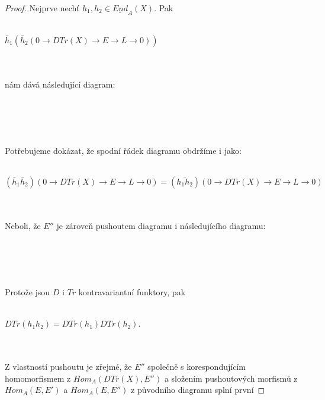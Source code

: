         \begin{proof}
           Nejprve nechť $h_1,h_2\in \underline{End}_A(X)$. Pak \\\\
           \centerline{$\bar h_1(\bar h_2(0\to DTr(X)\to E\to L\to 0))$} \\\\
           nám dává následující diagram:  \\\\
          \centerline{}\\\\\\
          Potřebujeme dokázat, že spodní řádek diagramu obdržíme i jako:\\\\
           \centerline{$(\bar h_1\bar h_2)(0\to DTr(X)\to E\to L\to 0)=(\overline{h_1 h_2})(0\to DTr(X)\to E\to L\to 0)$} \\\\
           Neboli, že $E''$ je zároveň pushoutem diagramu i následujícího diagramu: \\\\
          \centerline{}\\\\\\
          Protože jsou $D$ i $Tr$ kontravariantní funktory, pak \\\\
          \centerline{$DTr(h_1h_2)=DTr(h_1)DTr(h_2)$.}\\\\
          Z vlastností pushoutu je zřejmé, že $E''$ společně s korespondujícím 
          homomorfismem z $Hom_A(DTr(X),E'')$ a složením pushoutových morfismů z 
          $Hom_A(E,E')$ a $Hom_A(E,E'')$ z původního diagramu splní první 

\end{proof}
